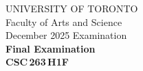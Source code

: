 \documentclass[12pt]{article}
\begin{document}
\newcommand{\spacer}[]{
  \vspace{5mm}\\
}

\newcommand{\hspacer}[]{\\
}

\begin{center}\large
  UNIVERSITY OF TORONTO\\
  Faculty of Arts and Science\\[1.75ex]
  December 2025 Examination\\[1.75ex]
  \textbf{Final Examination} \\
  \textbf{{CSC\,263\,H1F}}
\end{center}

\end{document}
